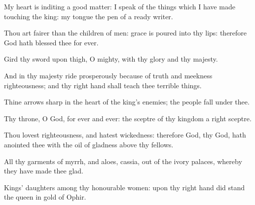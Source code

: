 {\Q {}My
heart is
inditing a
good
matter: I
speak of the things which I have
made touching the
king: my
tongue
{} the
pen of a
ready
writer.


\par }{\Q {}Thou art
fairer than the
children of
men:
grace is
poured into thy
lips: therefore
God hath
blessed thee for
ever.


\par }{\Q {}Gird thy
sword upon
{}
thigh, O
{}
mighty, with thy
glory and thy
majesty.


\par }{\Q {}And in thy
majesty
ride
prosperously
because of
truth and
meekness
{}
righteousness; and thy right
hand shall
teach thee terrible
things.


\par }{\Q {}Thine
arrows
{}
sharp in the
heart of the
king’s
enemies;
{} the
people
fall under thee.


\par }{\BB \par }
{\Q {}Thy
throne, O
God,
{} for
ever and
ever: the
sceptre of thy
kingdom
{} a
right
sceptre.


\par }{\Q {}Thou
lovest
righteousness, and
hatest
wickedness: therefore
God, thy
God, hath
anointed thee with the
oil of
gladness above thy
fellows.


\par }{\Q {}All thy
garments
{} of
myrrh, and
aloes,
{}
cassia, out of the
ivory
palaces,
whereby they have made thee
glad.


\par }{\Q {}Kings’
daughters
{} among thy honourable
women: upon thy right
hand did
stand the
queen in
gold of
Ophir.


\par }{\BB \par }
